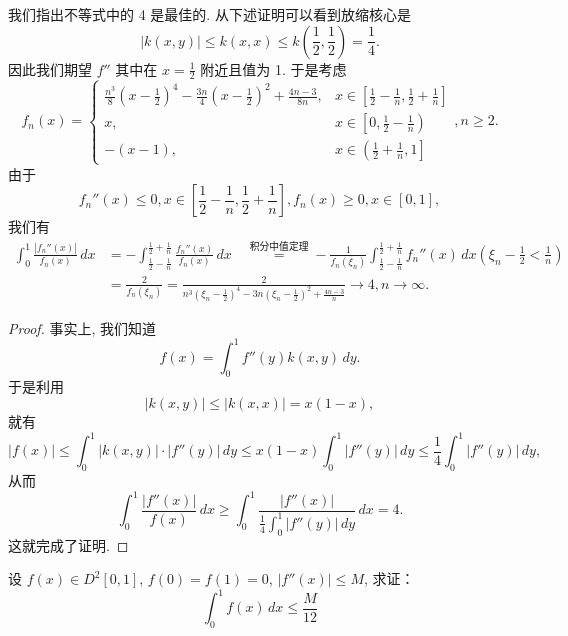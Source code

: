 \documentclass[lang=cn,10pt,thmcnt=section]{elegantbook}
\begin{document}
\begin{remark}
	我们指出不等式中的 4 是最佳的. 从下述证明可以看到放缩核心是
\[
|k(x, y)| \le k(x, x) \le k\left(\frac{1}{2}, \frac{1}{2}\right) = \frac{1}{4}.
\]
因此我们期望 $f''$ 其中在 $x=\frac{1}{2}$ 附近且值为 1. 于是考虑
\[
f_n(x) = 
\begin{cases}
    \frac{n^3}{8} \left(x - \frac{1}{2}\right)^4 - \frac{3n}{4} \left(x - \frac{1}{2}\right)^2 + \frac{4n-3}{8n}, & x \in \left[\frac{1}{2} - \frac{1}{n}, \frac{1}{2} + \frac{1}{n}\right] \\
    x, & x \in \left[0, \frac{1}{2} - \frac{1}{n}\right) \\
    -(x-1), & x \in \left(\frac{1}{2} + \frac{1}{n}, 1\right]
\end{cases}
, n \ge 2.
\]
由于
\[
f_n''(x) \le 0, x \in \left[\frac{1}{2} - \frac{1}{n}, \frac{1}{2} + \frac{1}{n}\right], f_n(x) \ge 0, x \in [0, 1],
\]
我们有
\begin{align*}
\int_0^1 \frac{|f_n''(x)|}{f_n(x)} \, dx &= -\int_{\frac{1}{2}-\frac{1}{n}}^{\frac{1}{2}+\frac{1}{n}} \frac{f_n''(x)}{f_n(x)} \, dx \quad \overset{\text{积分中值定理}}{=} -\frac{1}{f_n(\xi_n)} \int_{\frac{1}{2}-\frac{1}{n}}^{\frac{1}{2}+\frac{1}{n}} f_n''(x) \, dx \left(\xi_n - \frac{1}{2} < \frac{1}{n}\right) \\
&= \frac{2}{f_n(\xi_n)} = \frac{2}{n^3(\xi_n - \frac{1}{2})^4 - 3n(\xi_n - \frac{1}{2})^2 + \frac{4n-3}{n}} \to 4, n \to \infty.
\end{align*}
\end{remark}
\begin{proof}
	事实上, 我们知道
\[
f(x) = \int_0^1 f''(y) k(x, y) \, dy.
\]
于是利用
\[
|k(x, y)| \le |k(x, x)| = x(1-x),
\]
就有
\[
|f(x)| \le \int_0^1 |k(x,y)| \cdot |f''(y)| \, dy \le x(1-x) \int_0^1 |f''(y)| \, dy \le \frac{1}{4} \int_0^1 |f''(y)| \, dy,
\]
从而
\[
\int_0^1 \frac{|f''(x)|}{f(x)} \, dx \ge \int_0^1 \frac{|f''(x)|}{\frac{1}{4} \int_0^1 |f''(y)| \, dy} \, dx = 4.
\]
这就完成了证明.
\end{proof}
\begin{example}
	设 \( f(x) \in D^2[0, 1] \), \( f(0) = f(1) = 0 \), \( |f''(x)| \leq M \), 求证：
    \[ \int_{0}^{1} f(x) \, dx \leq \frac{M}{12} \]
    
\end{example}
\end{document}
